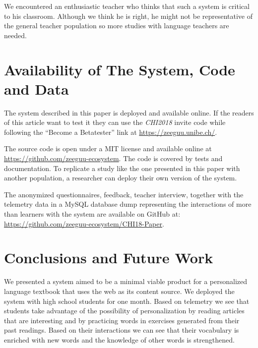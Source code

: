 We encountered an enthusiastic teacher who thinks that such a system is critical to his classroom. Although we think he is right, he might not be representative of the general teacher population so more studies with language teachers are needed.


\section{Availability of The System, Code and Data}

The system described in this paper is deployed and available online. If the readers of this article want to test it they can use the {\em CHI2018} invite code while following the  ``Become a Betatester'' link at \url{https://zeeguu.unibe.ch/}.

The source code is open under a MIT license and available online at \url{https://github.com/zeeguu-ecosystem}. The code is covered by tests and documentation. To replicate a study like the one presented in this paper with another population, a researcher can deploy their own version of the system. 

The anonymized questionnaires, feedback, teacher interview, 
together with the telemetry data in a MySQL database dump representing the interactions of more than \students learners with the system are available on GitHub at: \url{https://github.com/zeeguu-ecosystem/CHI18-Paper}. 





\section{Conclusions and Future Work}
We presented a system aimed to be a minimal viable product for a personalized language textbook that uses the web as its content source. We deployed the system with \studs high school students for one month. 
Based on telemetry we see that students take advantage of the possibility of personalization by 
  reading articles that are interesting and 
  by practicing words in exercises generated from their past readings. 
Based on their interactions we can see that their vocabulary is enriched with new words and the knowledge of other words is strengthened.

